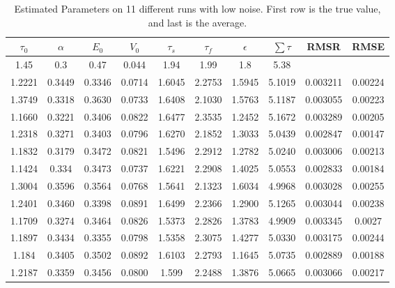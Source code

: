 \begin{table}[t]
\centering
\begin{tabular}{|c | c | c | c | c | c | c | c | c | c |}
\hline
$\tau_0$ & $\alpha$ & $E_0$    & $V_0$    & $\tau_s$ & $\tau_f$ & $\epsilon$  & $ \sum \tau $ & \ac{RMSR} & \ac{RMSE} \\
\hline
\rowcolor[gray]{.8}
1.45 & 0.3 & 0.47 & 0.044 & 1.94 & 1.99 & 1.8  & 5.38 &  & \\
\hline
\hline
1.2221 & 0.3449 & 0.3346 & 0.0714 & 1.6045 & 2.2753 & 1.5945 & 5.1019 &  0.003211  & 0.00224\\
1.3749 & 0.3318 & 0.3630 & 0.0733 & 1.6408 & 2.1030 & 1.5763 & 5.1187 &  0.003055  & 0.00223\\
1.1660 & 0.3221 & 0.3406 & 0.0822 & 1.6477 & 2.3535 & 1.2452 & 5.1672 &  0.003289  & 0.00205\\
1.2318 & 0.3271 & 0.3403 & 0.0796 & 1.6270 & 2.1852 & 1.3033 & 5.0439 &  0.002847  & 0.00147\\
1.1832 & 0.3179 & 0.3472 & 0.0821 & 1.5496 & 2.2912 & 1.2782 & 5.0240 &  0.003006  & 0.00213\\
1.1424 & 0.334  & 0.3473 & 0.0737 & 1.6221 & 2.2908 & 1.4025 & 5.0553 &  0.002833  & 0.00184\\
1.3004 & 0.3596 & 0.3564 & 0.0768 & 1.5641 & 2.1323 & 1.6034 & 4.9968 &  0.003028  & 0.00255\\
1.2401 & 0.3460 & 0.3398 & 0.0891 & 1.6499 & 2.2366 & 1.2900 & 5.1265 &  0.003044  & 0.00238\\
1.1709 & 0.3274 & 0.3464 & 0.0826 & 1.5373 & 2.2826 & 1.3783 & 4.9909 &  0.003345  & 0.0027 \\
1.1897 & 0.3434 & 0.3355 & 0.0798 & 1.5358 & 2.3075 & 1.4277 & 5.0330 &  0.003175  & 0.00244\\
1.184 &  0.3405 & 0.3502 & 0.0892 & 1.6103 & 2.2793 & 1.1645 & 5.0735 &  0.002889  & 0.00188\\
\hline                                                                               
1.2187 & 0.3359 & 0.3456 & 0.0800 & 1.599 & 2.2488 & 1.3876 & 5.0665 & 0.003066     & 0.00217\\
\hline
\end{tabular}
\caption{Estimated Parameters on 11 different runs with low noise. First row is the true value, and last is the average.}
\label{tab:LowNoiseResults}
\end{table}

